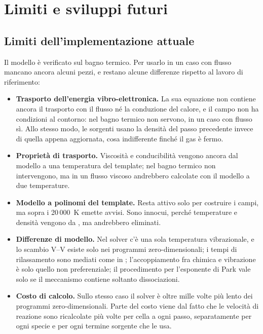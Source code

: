 \section{Limiti e sviluppi futuri}
\label{sec:limiti}

\subsection{Limiti dell'implementazione attuale}
\label{sec:limiti-attuali}

Il modello è verificato sul bagno termico. Per usarlo in un caso con flusso
mancano ancora alcuni pezzi, e restano alcune differenze rispetto al lavoro di
riferimento:

\begin{itemize}[leftmargin=1.6em]
  \item \textbf{Trasporto dell'energia vibro-elettronica.} La sua equazione
    non contiene ancora il trasporto con il flusso né la conduzione del
    calore, e il campo non ha condizioni al contorno: nel bagno termico non
    servono, in un caso con flusso sì. Allo stesso modo, le sorgenti usano la
    densità del passo precedente invece di quella appena aggiornata, cosa
    indifferente finché il gas è fermo.
  \item \textbf{Proprietà di trasporto.} Viscosità e conducibilità vengono
    ancora dal modello a una temperatura del template; nel bagno termico non
    intervengono, ma in un flusso viscoso andrebbero calcolate con il modello
    a due temperature.
  \item \textbf{Modello a polinomi del template.} Resta attivo solo per
    costruire i campi, ma sopra i 20\,000~K emette avvisi. Sono innocui,
    perché temperature e densità vengono da \mpp, ma andrebbero eliminati.
  \item \textbf{Differenze di modello.} Nel solver c'è una sola temperatura
    vibrazionale, e lo scambio V--V esiste solo nei programmi
    zero-dimensionali; i tempi di rilassamento sono mediati come in \mpp;
    l'accoppiamento fra chimica e vibrazione è solo quello non preferenziale;
    il procedimento per l'esponente di Park vale solo se il meccanismo
    contiene soltanto dissociazioni.
  \item \textbf{Costo di calcolo.} Sullo stesso caso il solver è oltre mille
    volte più lento dei programmi zero-dimensionali. Parte del costo viene dal
    fatto che le velocità di reazione sono ricalcolate più volte per cella a
    ogni passo, separatamente per ogni specie e per ogni termine sorgente che
    le usa.
\end{itemize}

